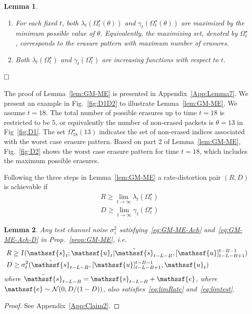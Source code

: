 \documentclass[journal, twocolumn, 10pt]{IEEEtran}
\newtheorem{lemma}{Lemma}
\newcommand{\rve}{{\mathssf{e}}}    %
\newcommand{\rvs}{{\mathssf{s}}}    %
\newcommand{\rvu}{{\mathssf{u}}}    %
\begin{document}
{\begin{lemma}
\begin{enumerate}
\item For each fixed $t$, both $\lambda_{t}(\Omega^\star_t(\theta))$ and $\gamma_t(\Omega_t^\star(\theta))$ are maximized by the minimum possible value of $\theta$. Equivalently, the maximizing set, denoted by $\Omega^\star_t$, corresponds to the erasure pattern with maximum number of erasures. 
\item Both $\lambda_{t}(\Omega^{\star}_t)$ and $\gamma_{t}(\Omega^{\star}_t)$ are increasing functions with respect to $t$. 
 
\end{enumerate}
$\hfill\Box$
\end{lemma}

The proof of Lemma~\ref{lem:GM-ME} is presented in Appendix~\ref{App:Lemma7}. We present an example  in Fig.~\ref{fig:D1D2} to illustrate Lemma~\ref{lem:GM-ME}. We assume $t=18$. The total number of possible erasures up to time $t=18$ is restricted to be $5$, or equivalently the number of non-erased packets is $\theta = 13$ in Fig~\ref{fig:D1}. The set $\Omega^{\star}_{18}(13)$ indicates the set of  non-erased indices associated with the worst case erasure pattern.  Based on part 2 of  Lemma~\ref{lem:GM-ME}, Fig.~\ref{fig:D2} shows the worst case erasure pattern for time $t=18$, which includes the maximum possible erasures. 




Following  the three steps in Lemma~\ref{lem:GM-ME} a rate-distortion pair $(R,D)$ is achievable if
\begin{align}
&R\ge \lim_{t\to \infty} \lambda_{t}(\Omega^{\star}_t) \label{eq:limRate}\\
&D\ge \lim_{t\to \infty} \gamma_{t}(\Omega^{\star}_t) \label{eq:limtest}
\end{align}


{\begin{lemma}
\label{Claim:2}
Any test channel noise $\sigma^2_{z}$ satisfying~\eqref{eq:GM-ME-Ach} and~\eqref{eq:GM-ME-Ach-D} in Prop.~\ref{prop:GM-ME}, i.e. 
\begin{align}
&R\ge I(\rvs_{t};\rvu_{t} | \tilde{\rvs}_{t-L-B} ,  [\rvu]_{t-L-B+1}^{t-B-1})\\
&D\ge \sigma^{2}_{t}( \tilde{\rvs}_{t-L-B}, [\rvu]_{t-L-B+1}^{t-B-1},\rvu_{t}) \label{eq:Q3}
\end{align} 
where $\tilde{\rvs}_{t-L-B} = {\rvs}_{t-L-B} +\rve$, where $\rve\sim \mathcal{N}(0, D/(1-D))$,  also satisfies~\eqref{eq:limRate} and~\eqref{eq:limtest}. 
\end{lemma}}
\begin{proof}
See Appendix~\ref{App:Claim2}.
\end{proof}

}
\end{document}
